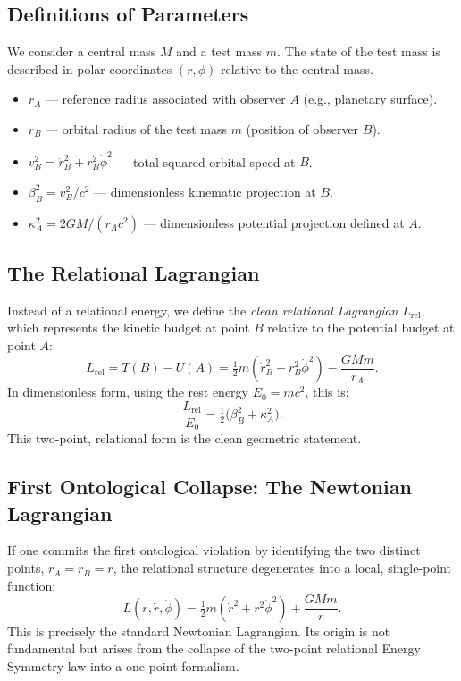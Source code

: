 \documentclass[12pt, a4paper]{article}
\begin{document}
\subsection{Definitions of Parameters}

We consider a central mass $M$ and a test mass $m$. The state of the test 
mass is described in polar coordinates $(r,\phi)$ relative to the central 
mass.

\begin{itemize}
  \item $r_A$ --- reference radius associated with observer $A$ 
  (e.g., planetary surface).
  \item $r_B$ --- orbital radius of the test mass $m$ (position of observer $B$).
  \item $v_B^2 = \dot r_B^2 + r_B^2 \dot\phi^2$ --- total squared orbital speed at $B$.
  \item $\beta_B^2 = v_B^2/c^2$ --- dimensionless kinematic projection at $B$.
  \item $\kappa_A^2 = 2GM/(r_A c^2)$ --- dimensionless potential projection defined at $A$.
\end{itemize}

\subsection{The Relational Lagrangian}

Instead of a relational energy, we define the \emph{clean relational Lagrangian} $L_{\text{rel}}$, which represents the kinetic budget at point $B$ relative to the potential budget at point $A$:
\begin{equation}
L_{\text{rel}} = T(B) - U(A) = \tfrac{1}{2} m\left(\dot r_B^2 + r_B^2 \dot\phi^2\right) - \frac{GMm}{r_A}.
\end{equation}
In dimensionless form, using the rest energy $E_0 = mc^2$, this is:
\begin{equation}
\frac{L_{\text{rel}}}{E_0} = \tfrac{1}{2}\bigl(\beta_B^2 + \kappa_A^2\bigr).
\end{equation}
This two-point, relational form is the clean geometric statement.

\subsection{First Ontological Collapse: The Newtonian Lagrangian}

If one commits the first ontological violation by identifying the two 
distinct points, $r_A = r_B = r$, the relational structure degenerates into a 
local, single-point function:
\begin{equation}
L(r,\dot r,\dot\phi)=\tfrac12 m(\dot r^2+r^2\dot\phi^2)+\frac{GMm}{r}.
\end{equation}
This is precisely the standard Newtonian Lagrangian. Its origin is not fundamental 
but arises from the collapse of the two-point relational Energy Symmetry law into 
a one-point formalism.
\end{document}
